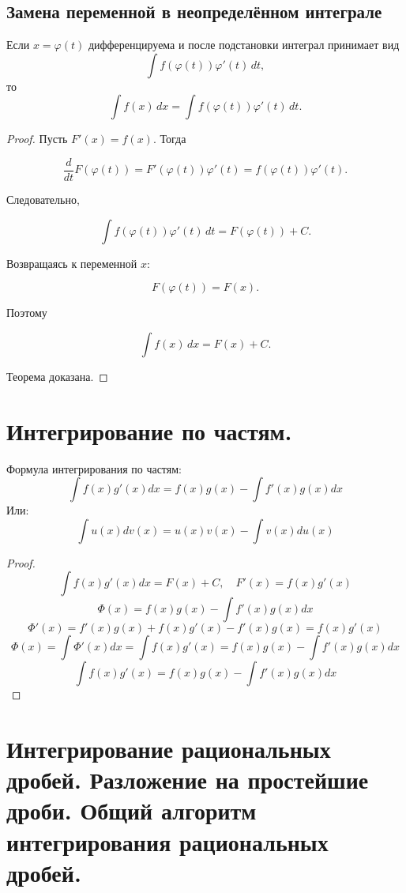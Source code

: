 \documentclass[14pt]{extreport}
\begin{document}
\section{Замена переменной в неопределённом интеграле}

\begin{theorem}
Если $x=\varphi(t)$
дифференцируема и после подстановки интеграл принимает вид
\[
\int f(\varphi(t))\varphi'(t)\,dt,
\]
то
\[
\int f(x)\,dx
=
\int f(\varphi(t))\varphi'(t)\,dt.
\]
\end{theorem}

\begin{proof}

Пусть $F'(x)=f(x).$ Тогда

\[
\frac{d}{dt}F(\varphi(t))
=
F'(\varphi(t))\varphi'(t)
=
f(\varphi(t))\varphi'(t).
\]

Следовательно,

\[
\int f(\varphi(t))\varphi'(t)\,dt
=
F(\varphi(t))+C.
\]

Возвращаясь к переменной $x$:

\[
F(\varphi(t))
=
F(x).
\]

Поэтому

\[
\int f(x)\,dx
=
F(x)+C.
\]

Теорема доказана.
\end{proof}

    \chapter{Интегрирование по частям.}
    \begin{theorem}
        Формула интегрирования по частям:
        $$
        \int f(x) g'(x)dx = f(x)g(x)- \int f'(x)g(x)dx
        $$
        Или:
        $$
        \int u(x)dv(x) = u(x)v(x) - \int v(x)du(x)
        $$
    \end{theorem}
    \begin{proof}
        $$
        \int f(x)g'(x)dx = F(x)+C, \quad F'(x) = f(x)g'(x)
        $$
        $$
        \Phi(x) = f(x)g(x) - \int f'(x)g(x)dx
        $$
        $$
        \Phi'(x) = f'(x)g(x) + f(x)g'(x) - f'(x)g(x) = f(x)g'(x)
        $$
        $$
        \Phi(x) = \int \Phi'(x)dx = \int f(x)g'(x) = f(x)g(x) - \int f'(x)g(x)dx
        $$
        $$
        \boxed{\int f(x)g'(x) = f(x)g(x) - \int f'(x)g(x)dx}
        $$
    \end{proof}

    \chapter{Интегрирование рациональных дробей. Разложение на простейшие дроби. Общий алгоритм интегрирования рациональных дробей.}
\end{document}
